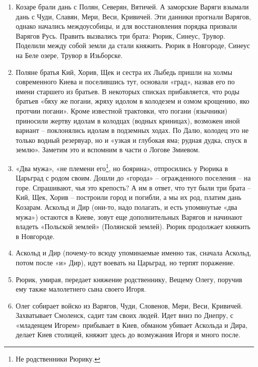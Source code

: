 \begin{enumerate}
\item Козаре брали дань с Полян, Северян, Вятичей. А заморские Варяги взымали дань с Чуди, Славян, Мери, Веси, Кривичей. Эти данники прогнали Варягов, однако начались междоусобицы, и для восстановления порядка призвали Варягов Русь. Править вызвались три брата: Рюрик, Синеус, Трувор. Поделили между собой земли да стали княжить. Рюрик в Новгороде, Синеус на Беле озере, Трувор в Изьборске.

\item Поляне братья Кий, Хорив, Щек и сестра их Лыбедь пришли на холмы современного Киева и поселившись тут, основали «град», назвав его по имени старшего из братьев. В некоторых списках прибавляется, что роды братьев «бяху же погани, жряху идолом в колодезем и озмом крощению, яко протчии погани». Кроме известной трактовки, что погани (язычники) приносили жертву идолам в колодцах (водных криницах), возможен иной вариант – поклонялись идолам в подземных ходах. По Далю, колодец это не только водный резервуар, но и «узкая и глубокая яма; рудная дудка, спуск в землю». Заметим это и вспомним в части о Логове Змиевом.

\item «Два мужа», «не племени его\footnote{Не родственники Рюрику.}, но боярина», отпросились у Рюрика в Царьград с родом своим. Дошли до «города» – огражденного поселения – на горе. Спрашивают, чья это крепость? А им в ответ, что тут были три брата – Кий, Щек, Хорив – построили город и погибли, а мы их род, платим дань Козарам. Аскольд и Дир (они-то, надо полагать, и есть упомянутые «два мужа») остаются в Киеве, зовут еще дополнительных Варягов и начинают владеть «Польской землей» (Полянской землей). Рюрик продолжает княжить в Новгороде.

\item Аскольд и Дир (почему-то всюду упоминаемые именно так, сначала Аскольд, потом после «и» Дир), идут воевать на Царьград, но терпят поражение.

\item Рюрик, умирая, передает княжение родственнику, Вещему Олегу, поручив ему также малолетнего сына своего Игоря.

\item Олег собирает войско из Варягов, Чуди, Словенов, Мери, Веси, Кривичей. Захватывает Смоленск, садит там своих людей. Идет вниз по Днепру, с «младенцем Игорем» прибывает в Киев, обманом убивает Аскольда и Дира, делает Киев столицей, княжит здесь до возмужания Игоря и много после.
\end{enumerate}

